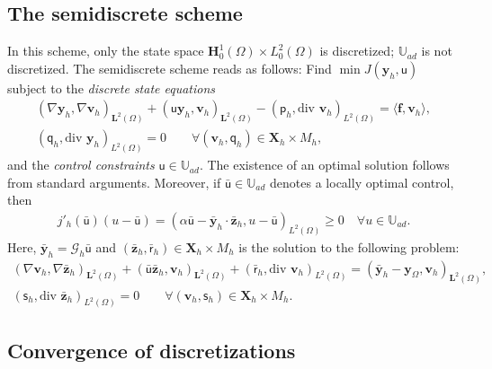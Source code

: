 \documentclass[final]{siamart0216}
\begin{document}
\subsection{The semidiscrete scheme}
\label{semi_discrete_framework}
\label{sectionsemi-discrete}
In this scheme, only the state space $\mathbf{H}_0^1(\Omega) \times L_0^2(\Omega)$ is discretized; $\mathbb{U}_{ad}$ is not discretized. The semidiscrete scheme reads as follows: Find $\min J(\mathbf{y}_{h},\mathsf{u})$ subject to the \emph{discrete state equations}
\begin{multline}\label{eq:brinkamn_problem_state_sd}
(\nabla \mathbf{y}_{h},\nabla \mathbf{v}_{h})_{\mathbf{L}^2(\Omega)}
+
( \mathsf{u}\mathbf{y}_{h}, \mathbf{v}_{h})_{\mathbf{L}^2(\Omega)}
-
(\mathsf{p}_{h},\text{div }\mathbf{v}_{h})_{L^2(\Omega)} =  \langle \mathbf{f},\mathbf{v}_{h} \rangle,
\\
(\mathsf{q}_{h},\text{div }\mathbf{y}_{h})_{L^2(\Omega)} =  0 \qquad \forall (\mathbf{v}_{h},\mathsf{q}_{h}) \in \mathbf{X}_h \times M_h,
\end{multline}
and the \emph{control constraints} $\mathsf{u}\in\mathbb{U}_{ad}$. The existence of an optimal solution follows from standard arguments. Moreover, if $\bar{\mathsf{u}}\in\mathbb{U}_{ad}$ denotes a locally optimal control, then
\begin{eqnarray}\label{eq:variational_inequality_semi-discrete}
j'_h(\bar{\mathsf{u}})(u-\bar{\mathsf{u}})=(\alpha \bar{\mathsf{u}}-\bar{\mathbf{y}}_{h}\cdot \bar{\mathbf{z}}_{h},u-\bar{\mathsf{u}})_{L^2(\Omega)}\geq 0\quad\forall u\in \mathbb{U}_{ad}.
\end{eqnarray}
Here, $\bar{\mathbf{y}}_h = \mathcal{G}_h \bar{\mathsf{u}}$ and $(\bar{\mathbf{z}}_{h},\bar{\mathsf{r}}_{h})\in \mathbf{X}_h\times M_h $ is the solution to the following problem:
\begin{multline}\label{eq:brinkman_problem_adjoint_semi}
(\nabla \mathbf{v}_{h},\nabla \bar{\mathbf{z}}_{h})_{\mathbf{L}^2(\Omega)}
+
(\bar{\mathsf{u}}\bar{\mathbf{z}}_{h}, \mathbf{v}_{h})_{\mathbf{L}^2(\Omega)}
+
(\bar{\mathsf{r}}_{h},\text{div }\mathbf{v}_{h})_{L^2(\Omega)} =  (\bar{\mathbf{y}}_{h}-\mathbf{y}_{\Omega},\mathbf{v}_{h})_{\mathbf{L}^2(\Omega)},
\\
(\mathsf{s}_{h},\text{div }\bar{\mathbf{z}}_{h})_{L^2(\Omega)}  =  0 \qquad \forall (\mathbf{v}_{h},\mathsf{s}_{h})\in \mathbf{X}_h\times M_h.
\end{multline}

\subsection{Convergence of discretizations}
\end{document}
